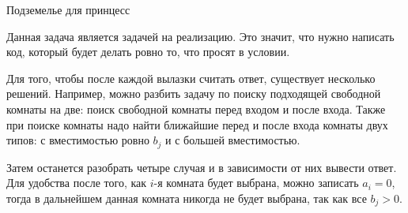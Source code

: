 \begin{tutorial}{Подземелье для принцесс}

Данная задача является задачей на реализацию. Это значит, что нужно написать код, который будет делать ровно то, что просят в условии.

Для того, чтобы после каждой вылазки считать ответ, существует несколько решений. Например, можно разбить задачу по поиску подходящей свободной комнаты на две: поиск свободной комнаты перед входом и после входа. Также при поиске комнаты надо найти ближайшие перед и после входа комнаты двух типов: с вместимостью ровно $b_j$ и с большей вместимостью.

Затем останется разобрать четыре случая и в зависимости от них вывести ответ. Для удобства после того, как $i$-я комната будет выбрана, можно записать $a_i = 0$, тогда в дальнейшем данная комната никогда не будет выбрана, так как все $b_j > 0$.

\end{tutorial}
